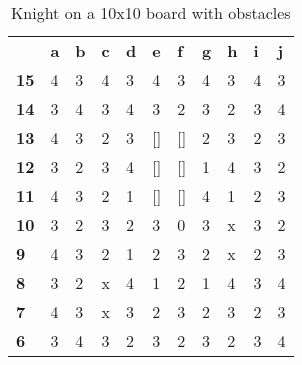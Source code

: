 \documentclass{article}
\begin{document}
\begin{table}[H]
\centering
\caption{Knight on a 10x10 board with obstacles}
\label{my-label}
\begin{tabular}{lllllllllll}
                                 & \textbf{a} & \textbf{b} & \textbf{c} & \textbf{d} & \textbf{e} & \textbf{f} & \textbf{g} & \textbf{h} & \textbf{i} & \textbf{j} \\ \cline{2-11} 
\multicolumn{1}{l|}{\textbf{15}} & 4          & 3          & 4          & 3          & 4          & 3          & 4          & 3          & 4          & 3          \\
\multicolumn{1}{l|}{\textbf{14}} & 3          & 4          & 3          & 4          & 3          & 2          & 3          & 2          & 3          & 4          \\
\multicolumn{1}{l|}{\textbf{13}} & 4          & 3          & 2          & 3          & {[}{]}          & {[}{]}          & 2          & 3          & 2          & 3          \\
\multicolumn{1}{l|}{\textbf{12}} & 3          & 2          & 3          & 4          & {[}{]}          & {[}{]}          & 1          & 4          & 3          & 2          \\
\multicolumn{1}{l|}{\textbf{11}} & 4          & 3          & 2          & 1          & {[}{]}          & {[}{]}          & 4          & 1          & 2          & 3          \\
\multicolumn{1}{l|}{\textbf{10}} & 3          & 2          & 3          & 2          & 3          & 0          & 3          & x          & 3          & 2          \\
\multicolumn{1}{l|}{\textbf{9}}  & 4          & 3          & 2          & 1          & 2          & 3          & 2          & x          & 2          & 3          \\
\multicolumn{1}{l|}{\textbf{8}}  & 3          & 2          & x          & 4          & 1          & 2          & 1          & 4          & 3          & 4          \\
\multicolumn{1}{l|}{\textbf{7}}  & 4          & 3          & x          & 3          & 2          & 3          & 2          & 3          & 2          & 3          \\
\multicolumn{1}{l|}{\textbf{6}}  & 3          & 4          & 3          & 2          & 3          & 2          & 3          & 2          & 3          & 4         
\end{tabular}
\end{table}
\end{document}
